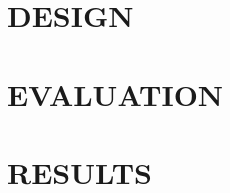 \documentclass[twocolumn,10pt]{asme2e}
\begin{document}
\section*{DESIGN}


\subsection*{}
\subsection*{} 
\subsection*{}
\subsection*{}


\section*{EVALUATION}

\subsection*{}

\subsection*{} 
\section*{RESULTS}

\subsection*{}

\subsection*{}

\subsection*{}
\end{document}
